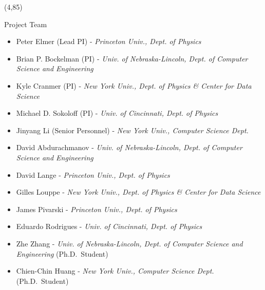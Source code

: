 \documentclass[final]{beamer}
\begin{document}
\begin{frame}{}







\begin{textblock}{38.0}(4,85)
\begin{block}{Project Team}
\begin{itemize}
\item Peter Elmer (Lead PI) - {\it Princeton Univ., Dept. of Physics}
\item Brian P. Bockelman (PI) - {\it Univ. of Nebraska-Lincoln, Dept. of Computer Science and Engineering}
\item Kyle Cranmer (PI) - {\it New York Univ., Dept. of Physics \& Center for Data Science}
\item Michael D. Sokoloff (PI) - {\it Univ. of Cincinnati, Dept. of Physics}
\item Jinyang Li (Senior Personnel) - {\it New York Univ., Computer Science Dept.}
\item David Abdurachmanov - {\it Univ. of Nebraska-Lincoln, Dept. of Computer Science and Engineering}
\item David Lange - {\it Princeton Univ., Dept. of Physics}
\item Gilles Louppe - {\it New York Univ., Dept. of Physics \& Center for Data Science}
\item James Pivarski - {\it Princeton Univ., Dept. of Physics}
\item Eduardo Rodrigues - {\it Univ. of Cincinnati, Dept. of Physics}
\item Zhe Zhang - {\it Univ. of Nebraska-Lincoln, Dept. of Computer Science and Engineering} (Ph.D.\ Student)
\item Chien-Chin Huang - {\it New York Univ., Computer Science Dept.} (Ph.D.\ Student) 
\end{itemize}
\end{block}
\end{textblock}


\end{frame}
\end{document}
